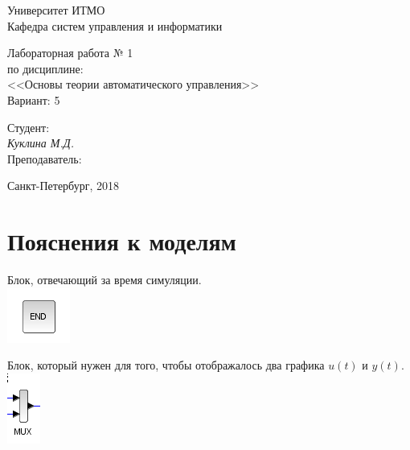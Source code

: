 \documentclass[12pt, a4paper] {ncc}
\begin{document}
\setcounter{figure}{0}
\frenchspacing
\pagestyle{empty}
\begin{center}
                            Университет ИТМО    \\
                        Кафедра систем управления и информатики


\end{center}
\begin{center}
			Лабораторная работа № 1\\
			по дисциплине: \\
		<<Основы теории автоматического управления>> \\
			Вариант: 5
\end{center}
\begin{flushright}
                                    Студент:\\
                                    {\it Куклина М.Д.}\\
                                    Преподаватель: \\
                                    {\it }
\end{flushright}
\begin{center}
                             Санкт-Петербург, 2018
\end{center}
\newpage

\section{Пояснения к моделям}
	Блок, отвечающий за время симуляции.\\
	\includegraphics[scale=0.6]{end.png}

	Блок, который нужен для того, чтобы отображалось два графика $u(t)$ и $y(t)$. \\
	\includegraphics[scale=0.6]{mux.png}
\end{document}
